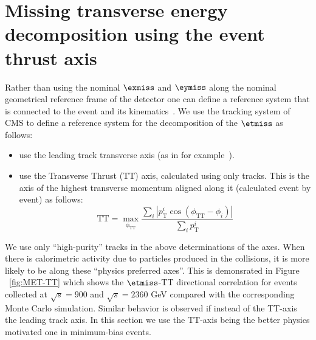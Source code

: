 
\section{Missing transverse energy decomposition using the
  event thrust axis }
Rather than using the nominal $\exmiss$ and $\eymiss$ along the nominal
geometrical reference frame of the detector one can define a reference
system that is connected to the event and its kinematics~\cite{CMS:AN-2009-025}.  We use the
tracking system of CMS to define a reference system for the
decomposition of the $\etmiss$ as follows:

\begin{itemize}
\item use the leading track transverse axis (as in for example~\cite{CMS:PAS-EWK-008-06}).
\item use the Transverse Thrust (TT) axis, calculated using only tracks. This
  is the axis of the  highest transverse momentum aligned along it
  (calculated event by event) as follows:
  \begin{equation}
    \mathrm{TT} = \max_{\phi_\mathrm{TT}}\frac{\sum_{i}|p_\text{T}^{i}\cos(\phi_\mathrm{TT}-\phi_{i})|}{\sum_{i}p_\text{T}^{i}}
  \end{equation}
\end{itemize}

We use only ``high-purity'' tracks in the above determinations of the
axes. When there is calorimetric activity due to particles produced in
the collisions, it is more likely to be along these ``physics
preferred axes''. This is demonsrated in Figure ~\ref{fig:MET-TT}
which shows the $\etmiss$-TT directional correlation for events collected at
$\sqrt{s}=900$ and $\sqrt{s}=2360$ GeV compared with the corresponding
Monte Carlo simulation.  Similar behavior is observed if instead of the
TT-axis the leading track axis. In this section we use the TT-axis
being the better physics motivated one in minimum-bias events.

